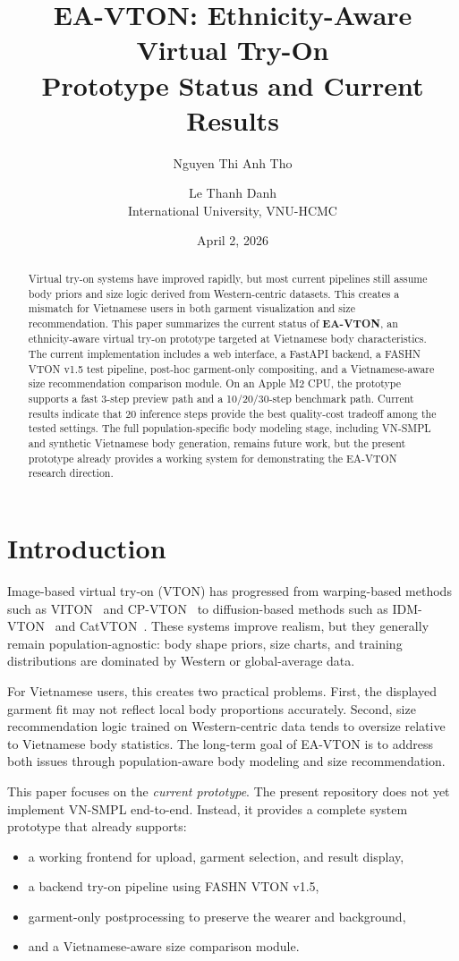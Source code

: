 \documentclass[a4paper,10pt,twocolumn]{article}
\title{
  \textbf{EA-VTON: Ethnicity-Aware Virtual Try-On} \\
  \textbf{Prototype Status and Current Results}
}
\author{
  Nguyen Thi Anh Tho \and Le Thanh Danh \\
  International University, VNU-HCMC
}
\date{April 2, 2026}
\begin{document}
\maketitle

\begin{abstract}
Virtual try-on systems have improved rapidly, but most current pipelines still assume body priors and size logic derived from Western-centric datasets. This creates a mismatch for Vietnamese users in both garment visualization and size recommendation. This paper summarizes the current status of \textbf{EA-VTON}, an ethnicity-aware virtual try-on prototype targeted at Vietnamese body characteristics. The current implementation includes a web interface, a FastAPI backend, a FASHN VTON v1.5 test pipeline, post-hoc garment-only compositing, and a Vietnamese-aware size recommendation comparison module. On an Apple M2 CPU, the prototype supports a fast 3-step preview path and a 10/20/30-step benchmark path. Current results indicate that 20 inference steps provide the best quality-cost tradeoff among the tested settings. The full population-specific body modeling stage, including VN-SMPL and synthetic Vietnamese body generation, remains future work, but the present prototype already provides a working system for demonstrating the EA-VTON research direction.
\end{abstract}

\section{Introduction}
\label{sec:intro}

Image-based virtual try-on (VTON) has progressed from warping-based methods such as VITON~\cite{han2018viton} and CP-VTON~\cite{wang2018cpvton} to diffusion-based methods such as IDM-VTON~\cite{choi2023idmvton} and CatVTON~\cite{choi2024catvton}. These systems improve realism, but they generally remain population-agnostic: body shape priors, size charts, and training distributions are dominated by Western or global-average data.

For Vietnamese users, this creates two practical problems. First, the displayed garment fit may not reflect local body proportions accurately. Second, size recommendation logic trained on Western-centric data tends to oversize relative to Vietnamese body statistics. The long-term goal of EA-VTON is to address both issues through population-aware body modeling and size recommendation.

This paper focuses on the \textit{current prototype}. The present repository does not yet implement VN-SMPL end-to-end. Instead, it provides a complete system prototype that already supports:
\begin{itemize}[leftmargin=*, itemsep=2pt]
  \item a working frontend for upload, garment selection, and result display,
  \item a backend try-on pipeline using FASHN VTON v1.5,
  \item garment-only postprocessing to preserve the wearer and background,
  \item and a Vietnamese-aware size comparison module.
\end{itemize}
\end{document}

